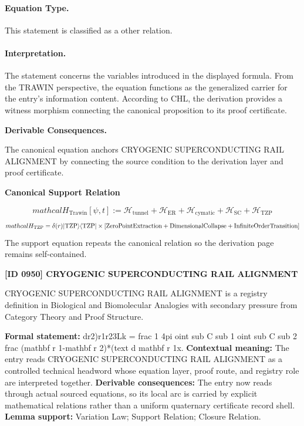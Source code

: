\paragraph{Equation Type.}
This statement is classified as a other relation.

\paragraph{Interpretation.}
The statement concerns the variables introduced in the displayed formula. From the TRAWIN perspective, the equation functions as the generalized carrier for the entry’s information content. According to CHL, the derivation provides a witness morphism connecting the canonical proposition to its proof certificate.

\par\vspace{0.35em}
\noindent\textbf{Derivable Consequences.}\quad
\begingroup
\footnotesize
\raggedright
The canonical equation anchors CRYOGENIC SUPERCONDUCTING RAIL ALIGNMENT by connecting the source condition to the derivation layer and proof certificate.
\par\endgroup

\noindent\textbf{Canonical Support Relation}\par
\[
mathcal{H}_{\text{Trawin}}[\psi, t] := \mathcal{H}_{\text{tunnel}} + \mathcal{H}_{\text{ER}} + \mathcal{H}_{\text{cymatic}} + \mathcal{H}_{\text{SC}} + \mathcal{H}_{\text{TZP}}
\]
\[
mathcal{H}_{\text{TZP}} = \delta(r)|{\rm TZP}\rangle\langle{\rm TZP}| \times \left[\text{ZeroPointExtraction} + \text{DimensionalCollapse} + \text{InfiniteOrderTransition}\right]
\]
\noindent The support equation repeats the canonical relation so the derivation page remains self-contained.\par

\clearpage
\noindent\textbf{[ID 0950] CRYOGENIC SUPERCONDUCTING RAIL ALIGNMENT}\par
\vspace{0.35em}
\begingroup\small
{}
CRYOGENIC SUPERCONDUCTING RAIL ALIGNMENT is a registry definition in Biological and Biomolecular Analogies with secondary pressure from Category Theory and Proof Structure.

\begingroup\footnotesize\setlength{\emergencystretch}{3em}\sloppy
\textbf{Formal statement:} dr2)r1r23Lk = frac 1 4pi oint sub C sub 1 oint sub C sub 2 frac (mathbf r 1-mathbf r 2)*(text d mathbf r 1x. \textbf{Contextual meaning:} The entry reads CRYOGENIC SUPERCONDUCTING RAIL ALIGNMENT as a controlled technical headword whose equation layer, proof route, and registry role are interpreted together. \textbf{Derivable consequences:} The entry now reads through actual sourced equations, so its local arc is carried by explicit mathematical relations rather than a uniform quaternary certificate record shell. \textbf{Lemma support:} Variation Law; Support Relation; Closure Relation.\par
\endgroup

